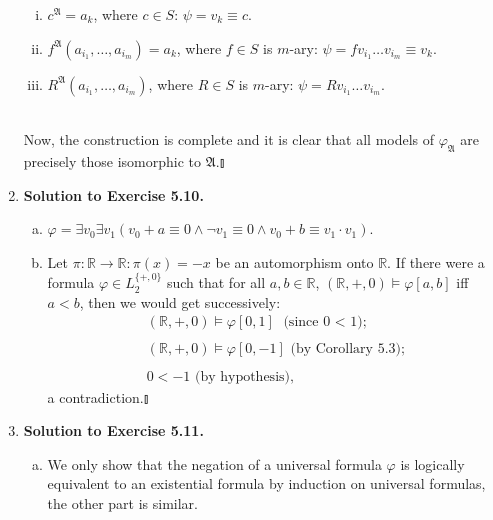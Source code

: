 \begin{enumerate}[1.]
\begin{enumerate}[(i)]
\item $c^{\mathfrak{A}} = a_k$, where $c \in S$: $\psi = v_k \equiv c$.
\item $f^{\mathfrak{A}} (a_{i_1}, \ldots , a_{i_m}) = a_k$, where $f \in S$ is $m$-ary: $\psi = fv_{i_1} \ldots v_{i_m} \equiv v_k$.
\item $R^{\mathfrak{A}} (a_{i_1}, \ldots , a_{i_m})$, where $R \in S$ is $m$-ary: $\psi = Rv_{i_1} \ldots v_{i_m}$.
\end{enumerate}
\ 
\\Now, the construction is complete and it is clear that all models of $\varphi_{\mathfrak{A}}$ are precisely those isomorphic to $\mathfrak{A}$.\nolinebreak\hfill$\talloblong$
%
\item \textbf{Solution to Exercise 5.10.}
\begin{enumerate}[(a)]
\item $\varphi = \exists v_0 \exists v_1 (v_0 + a \equiv 0 \land \neg v_1 \equiv 0 \land v_0 + b \equiv v_1 \cdot v_1 )$.
\item Let $\pi:\mathbb{R} \to \mathbb{R}:\pi(x) = -x$ be an automorphism onto $\mathbb{R}$. If there were a formula $\varphi \in L_2^{\{+, 0\}}$ such that for all $a, b \in \mathbb{R}$, $(\mathbb{R}, +, 0) \models \varphi[a, b]$ iff $a < b$, then we would get successively:
\[
\begin{array}{l}
(\mathbb{R}, +, 0) \models \varphi[0, 1] \mbox{\ (since 0 $<$ 1);} \\
\, \\
(\mathbb{R}, +, 0) \models \varphi[0, -1] \mbox{\ (by Corollary 5.3);} \\
\, \\
0 < -1 \mbox{\ (by hypothesis),}
\end{array}
\]
a contradiction.\nolinebreak\hfill$\talloblong$
\end{enumerate}
%
\item \textbf{Solution to Exercise 5.11.}
\begin{enumerate}[(a)]
\item We only show that the negation of a universal formula $\varphi$ is logically equivalent to an existential formula by induction on universal formulas, the other part is similar.\\

\end{enumerate}
\end{enumerate}
